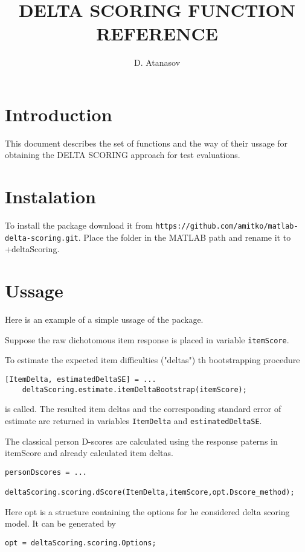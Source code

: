 \documentclass[12pt]{article}
\title{DELTA SCORING FUNCTION REFERENCE}
\author{D. Atanasov}
\begin{document}
\maketitle

\section{Introduction}
This document describes the set of functions and the way of their ussage for obtaining the DELTA SCORING approach for test evaluations.

\section{Instalation}
To install the package download it from 
{\tt https://github.com/amitko/matlab-delta-scoring.git}. 
Place the folder in the MATLAB path and rename it to +deltaScoring.

\section{Ussage}
Here is an example of a simple ussage of the package.

Suppose the raw dichotomous item response is placed in variable {\tt itemScore}.

To estimate the expected item difficulties ("deltas") th bootstrapping procedure

\begin{lstlisting}[style=Matlab-bw]
[ItemDelta, estimatedDeltaSE] = ...
	deltaScoring.estimate.itemDeltaBootstrap(itemScore);
\end{lstlisting}

is called. The resulted item deltas and the corresponding standard error of estimate are returned in variables {\tt ItemDelta} and  {\tt estimatedDeltaSE}.

The classical person D-scores are calculated using the response paterns in itemScore and already calculated item deltas.

\begin{lstlisting}[style=Matlab-bw]
personDscores = ...
	deltaScoring.scoring.dScore(ItemDelta,itemScore,opt.Dscore_method);
\end{lstlisting}

Here opt is a structure containing the options for he considered delta scoring model. It can be generated by

\begin{lstlisting}[style=Matlab-bw]
opt = deltaScoring.scoring.Options;
\end{lstlisting}
\end{document}
